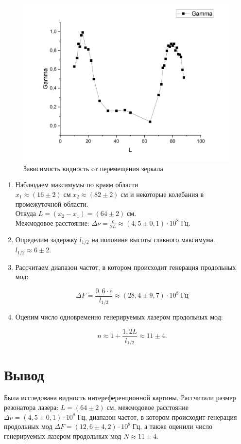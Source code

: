 \documentclass[a4paper,12pt]{article}
\begin{document}
\begin{figure}[h!]
	\begin{center}
		\includegraphics[scale = 0.5]{3.png}
		\caption{Зависимость видность от перемещения зеркала}
		\label{p1}
	\end{center}
\end{figure}
\begin{enumerate}
\item Наблюдаем максимумы по краям области $x_1 \approx (16 \pm 2) \; см \; x_2 \approx (82 \pm 2) \; см $ и некоторые колебания в промежуточной области. \\
Откуда $L = (x_2 - x_1) = (64 \pm 2) \; см$.\\
Межмодовое расстояние: $\varDelta\nu = \frac{c}{2L} \approx (4,5 \pm 0,1)\cdot 10^8 \; Гц$.
\item Определим задержку $l_{1/2}$ на половине высоты главного максимума.\\
$l_{1/2} \approx 6 \pm 2$.
\item Рассчитаем диапазон частот, в котором происходит генерация продольных мод:

\begin{equation}
\varDelta F = \frac{0,6\cdot c}{l_{1/2}} \approx (28,4 \pm 9,7)\cdot 10^8 \; Гц
\end{equation}

\item Оценим число одновременно генерируемых лазером продольных мод:

\begin{equation}
n \approx 1 + \frac{1,2L}{l_{1/2}} \approx 11 \pm 4. 
\end{equation}
\end{enumerate} 
\section{Вывод} 
Была исследована видность интереференционной картины. Рассчитали размер резонатора лазера:  $L = (64 \pm 2) \; см$, межмодовое расстояние $\varDelta\nu = (4,5 \pm 0,1)\cdot 10^8 \; Гц$, диапазон частот, в котором происходит генерация продольных мод $\varDelta F = (12,6 \pm 4,2)\cdot 10^8 \; Гц$, а также оценили число генерируемых лазером продольных мод $	N \approx  11 \pm 4.$
\end{document}
